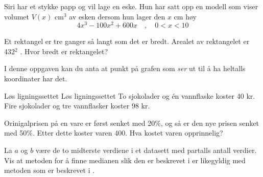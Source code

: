 Siri har et stykke papp og vil lage en eske. Hun har satt opp en modell som viser
volumet $ V(x) $ cm$ ^3 $ av esken dersom hun lager den $ x $ cm høy
\[ 4x^3-100x^2+600x\quad,\quad 0<x<10\]

Et rektangel er tre ganger så langt som det er bredt. Arealet av rektangelet er 432$ ^2 $ .\os
Hvor bredt er rektangelet?

\newpage
{}
I denne oppgaven kan du anta at punkt på grafen som \textit{ser} ut til å ha heltalls koordinater har det.


\nes
{}
Løs ligningssettet
Løs ligningssettet
\newpage
{}
To sjokolader og én vannflaske koster 40 kr.\\
Fire sjokolader og tre vannflasker koster 98 kr.

\newpage
{}
Orinigalprisen på en vare er først senket med 20\%, og så er den nye prisen senket med 50\%. Etter dette koster varen 400. Hva kostet varen opprinnelig?

La $ a $ og $ b $ være de to midterste verdiene i et datasett med partalls antall verdier. Vis at metoden for å finne medianen slik den er beskrevet i  er likegyldig med metoden som er beskrevet i .




